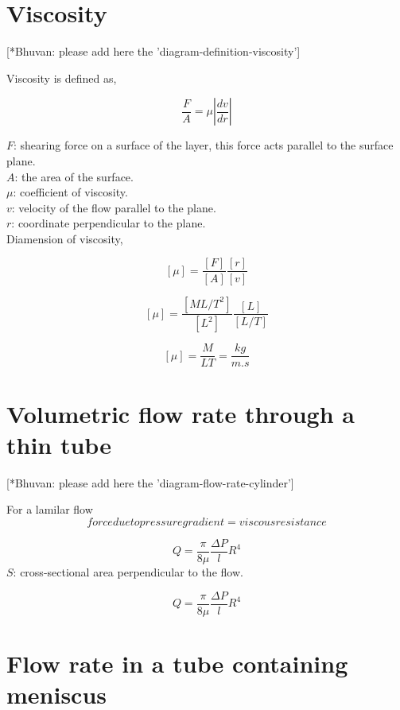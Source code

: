 \section{Viscosity}

	[*Bhuvan: please add here the 'diagram-definition-viscosity']
	
	Viscosity is defined as,

	\[ \frac{F}{A} = \mu \left| \frac{dv}{dr} \right| \]

	$F$: shearing force on a surface of the layer, this force acts parallel to the surface plane.\\
	$A$: the area of the surface.\\
	$\mu$: coefficient of viscosity.\\
	$v$: velocity of the flow parallel to the plane.\\
	$r$: coordinate perpendicular to the plane.\\
	
	Diamension of viscosity,
	
	\[ [\mu] = \frac{[F]}{[A]} \frac{[r]}{[v]} \]
	
	\[ [\mu] = \frac{[ML/T^2]}{[L^2]} \frac{[L]}{[L/T]} \]
	
	\begin{equation} \label{eq:diamension-mu}
	[\mu] = \frac{M}{LT} = \frac{kg}{m.s}
	\end{equation}

\section{Volumetric flow rate through a thin tube}
	
	[*Bhuvan: please add here the 'diagram-flow-rate-cylinder']
	
	For a lamilar flow
	\[ force due to pressure gradient = viscous resistance \]
	
	\begin{equation}
	\boxed{Q = \frac{\pi}{8\mu}\frac{\Delta P}{l} R^4}
	\end{equation}
	$S$: cross-sectional area perpendicular to the flow.

	\begin{equation} \label{eq:flow-rate}
	\boxed{Q = \frac{\pi}{8\mu}\frac{\Delta P}{l} R^4}
	\end{equation}

\section{Flow rate in a tube containing meniscus}

